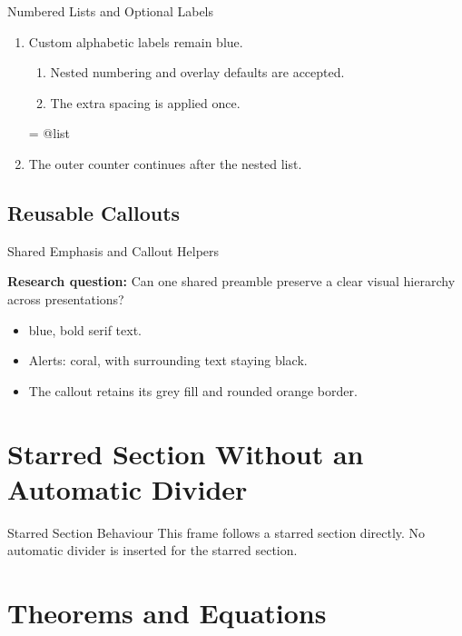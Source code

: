 \documentclass[\DesignTestOptions,xcolor={svgnames}]{beamer}
\makeatletter
\newcommand{\AssertListSpacing}{%
  \begingroup
    \dimen@=\itemsep
    \csname @list\romannumeral\@listdepth\endcsname
    \addtolength{\itemsep}{0.8\baselineskip}%
    \ifdim\dimen@=\itemsep\else
      \PackageError{beamer_design_test}{Incorrect list spacing}{Spacing must be added once at the current list font size.}%
    \fi
  \endgroup}
\makeatother
\begin{document}
\begin{frame}{Numbered Lists and Optional Labels}
  \begin{enumerate}[<+->][a)]
    \AssertListSpacing
    \item Custom alphabetic labels remain blue.
      \begin{enumerate}[<.->][i)]
        \AssertListSpacing
        \item Nested numbering and overlay defaults are accepted.
        \item The extra spacing is applied once.
      \end{enumerate}
    \AssertListSpacing
    \item The outer counter continues after the nested list.
  \end{enumerate}
\end{frame}

\subsection{Reusable Callouts}

\begin{frame}{Shared Emphasis and Callout Helpers}
  \begin{mblock}
    \alert{\textbf{Research question:}} Can one shared preamble preserve a
    clear visual hierarchy across presentations?
  \end{mblock}
  \begin{itemize}
    \item {} blue, bold serif text.
    \item \alert{Alerts:} coral, with surrounding text staying black.
    \item The callout retains its grey fill and rounded orange border.
  \end{itemize}
\end{frame}

\section*{Starred Section Without an Automatic Divider}
\begin{frame}{Starred Section Behaviour}
  This frame follows a starred section directly. No automatic divider is
  inserted for the starred section.
\end{frame}

\section{Theorems and Equations}
\end{document}
